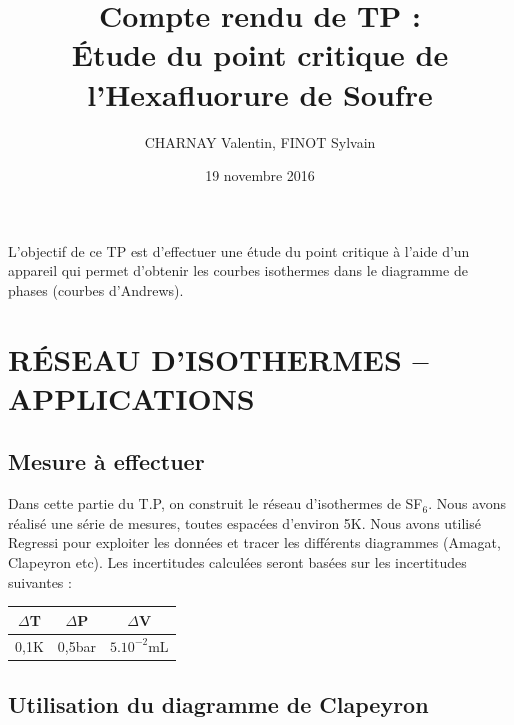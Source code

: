 \documentclass[12pt,a4paper]{article}
\date{19 novembre 2016}
\author{CHARNAY Valentin, FINOT Sylvain}
\title{Compte rendu de TP : \\ Étude du point critique de l'Hexafluorure de Soufre }
\begin{document}
\maketitle
L'objectif de ce TP est d'effectuer une étude du point critique à l'aide d'un appareil qui permet d'obtenir les courbes isothermes dans le diagramme de phases (courbes d'Andrews). 
\section{RÉSEAU D'ISOTHERMES – APPLICATIONS}
\subsection{Mesure à effectuer}
Dans cette partie du T.P, on construit le réseau d'isothermes de SF$_{6}$.
Nous avons réalisé une série de mesures, toutes espacées d'environ 5K. Nous avons utilisé Regressi pour exploiter les données et tracer les différents diagrammes (Amagat, Clapeyron etc). Les incertitudes calculées seront basées sur les incertitudes suivantes :
\begin{center}
\begin{tabular}{|c|c|c|}
\hline
$\Delta$T & $\Delta$P & $\Delta$V \\ \hline
0,1K      & 0,5bar       & $5.10^{-2}$mL       \\ \hline
\end{tabular}
\end{center}

\subsection{Utilisation du diagramme de Clapeyron}
\end{document}
